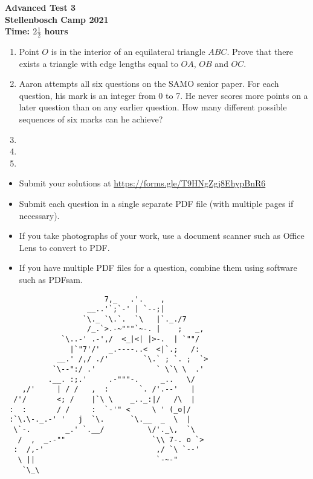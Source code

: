 \documentclass{article}
\begin{document}
\thispagestyle{empty}

\begin{center}
  \textbf{\Large Advanced Test 3}
  \\ \vspace{1em}
  \textbf{\large Stellenbosch Camp 2021}
  \\ \vspace{1em}
  \textbf{\large Time: $2\frac{1}{2}$ hours}
\end{center}

\bigskip

\begin{enumerate}[itemsep=\fill]

\item %
Point $O$ is in the interior of an equilateral triangle $ABC$. Prove that there exists a triangle with edge lengths equal to $OA$, $OB$ and $OC$.

\item %
Aaron attempts all six questions on the SAMO senior paper. For each question, his mark is an integer from 0 to 7. He never scores more points on a later question than on any earlier question. How many different possible sequences of six marks can he achieve? 


\item %


\item %


\item %

\end{enumerate}


\vfill
\begin{itemize}
	\item Submit your solutions at \href{https://forms.gle/T9HNgZgj8EhypBnR6}{https://forms.gle/T9HNgZgj8EhypBnR6}
	\item Submit each question in a single separate PDF file (with multiple pages if necessary).
	\item If you take photographs of your work, use a document scanner such as Office Lens to convert to PDF.
	\item If you have multiple PDF files for a question, combine them using software such as PDFsam.
\end{itemize}

\vfill
\centering
\begin{BVerbatim}
                       7,_   .'.    ,
                   __..'`;`-' | `--;|
                  `\._ `\.`.  `\   |`._./7
                   /_.`>.-~"""`~-. |    ;   _,
             `\..-' .-',/  <_|<| |>-.  | `""/
               |`"7'/'  _.----..<  <|`.;   /:
            __.' /,/ ./'        `\.` ; `. ;  `>
           `\--":/ .'              ` \`\ \  .'
          .__. :;.'     .-"""-.     _..   \/
    ,/'     | / /   ,  :       `. /'.--'   |
  /'/       <; /    |`\ \    _.._:|/   /\  |
 :  :       / /     :  `-'" <     \ ' (_o|/
 :`\.\-._.-' '   j  `\.      `\.__  _  \  |
  \`-.        _.' `.__/          \/'._\,  `\
   /  ,  _.-""                    `\\ 7-. o `>
  :  /,-'                          ,/ `\ `--'
   \ ||                            `-~-" 
    `\_\ 
\end{BVerbatim}
\end{document}
